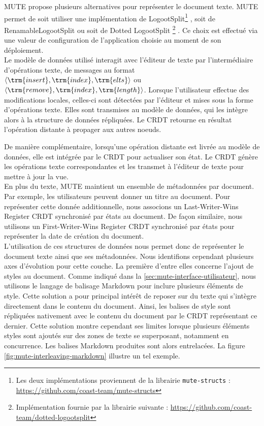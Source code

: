 \label{sec:mute-crdts}

MUTE propose plusieurs alternatives pour représenter le document texte.
MUTE permet de soit utiliser une implémentation de LogootSplit\footnote{Les deux implémentations proviennent de la librairie \texttt{mute-structs} : \url{https://github.com/coast-team/mute-structs}} , soit de RenamableLogootSplit\footnotemark[\value{footnote}]  ou soit de Dotted LogootSplit \footnote{Implémentation fournie par la librairie suivante : \url{https://github.com/coast-team/dotted-logootsplit}} \cite{2021-these-vic}.
Ce choix est effectué via une valeur de configuration de l'application choisie au moment de son déploiement.\\

Le modèle de données utilisé interagit avec l'éditeur de texte par l'intermédiaire d'opérations texte, \ie de messages au format $\langle \trm{insert}, \trm{index},\trm{elts} \rangle$ ou $\langle \trm{remove}, \trm{index}, \trm{length} \rangle$.
Lorsque l'utilisateur effectue des modifications locales, celles-ci sont détectées par l'éditeur et mises sous la forme d'opérations texte.
Elles sont transmises au modèle de données, qui les intègre alors à la structure de données répliquées.
Le \ac{CRDT} retourne en résultat l'opération distante à propager aux autres noeuds.

De manière complémentaire, lorsqu'une opération distante est livrée au modèle de données, elle est intégrée par le \ac{CRDT} pour actualiser son état.
Le \ac{CRDT} génère les opérations texte correspondantes et les transmet à l'éditeur de texte pour mettre à jour la vue.\\

En plus du texte, MUTE maintient un ensemble de métadonnées par document.
Par exemple, les utilisateurs peuvent donner un titre au document.
Pour représenter cette donnée additionnelle, nous associons un Last-Writer-Wins Register \ac{CRDT} synchronisé par états \cite{shapiro_2011_crdt} au document.
De façon similaire, nous utilisons un First-Writer-Wins Register \ac{CRDT} synchronisé par états pour représenter la date de création du document.\\

L'utilisation de ces structures de données nous permet donc de représenter le document texte ainsi que ses métadonnées.
Nous identifions cependant plusieurs axes d'évolution pour cette couche.
La première d'entre elles concerne l'ajout de styles au document.
Comme indiqué dans la \autoref{sec:mute-interface-utilisateur}, nous utilisons le langage de balisage Markdown pour inclure plusieurs éléments de style.
Cette solution a pour principal intérêt de reposer sur du texte qui s'intègre directement dans le contenu du document.
Ainsi, les balises de style sont répliquées nativement avec le contenu du document par le \ac{CRDT} représentant ce dernier.
Cette solution montre cependant ses limites lorsque plusieurs éléments styles sont ajoutés sur des zones de texte se superposant, notamment en concurrence.
Les balises Markdown produites sont alors entrelacées.
La figure \autoref{fig:mute-interleaving-markdown} illustre un tel exemple.

